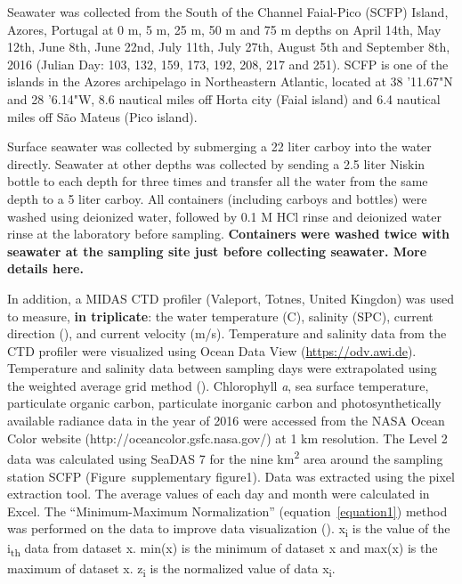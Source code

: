 \documentclass[a4,center,fleqn]{NAR}
\begin{document}
Seawater was collected from the South of the Channel Faial-Pico (SCFP) Island, Azores, Portugal at 0 m, 5 m, 25 m, 50 m and 75 m depths on April 14th, May 12th, June 8th, June 22nd, July 11th, July 27th, August 5th and September 8th, 2016 (Julian Day: 103, 132, 159, 173, 192, 208, 217 and 251). 
SCFP is one of the islands in the Azores archipelago in Northeastern Atlantic, located at 38 '11.67"N and 28 '6.14"W, 8.6 nautical miles off Horta city (Faial island) and 6.4 nautical miles off São Mateus (Pico island).

Surface seawater was collected by submerging a 22 liter carboy into the water directly.
Seawater at other depths was collected by sending a 2.5 liter Niskin bottle to each depth for three times and transfer all the water from the same depth to a 5 liter carboy.
All containers (including carboys and bottles) were washed using deionized water, followed by 0.1 M HCl rinse and deionized water rinse at the laboratory before sampling. 
\textbf{Containers were washed twice with seawater at the sampling site just before collecting seawater.
More details here.}

In addition, a MIDAS CTD profiler (Valeport, Totnes, United Kingdon) was used to measure, \textbf{in triplicate}: the water temperature (\degree C), salinity (SPC), current direction (\degree), and current velocity (m/s).
Temperature and salinity data from the CTD profiler were visualized using Ocean Data View (\url{https://odv.awi.de}). 
Temperature and salinity data between sampling days were extrapolated using the weighted average grid method (\cite{Schlitzer2002}).
Chlorophyll \textit{a}, sea surface temperature, particulate organic carbon, particulate inorganic carbon and photosynthetically available radiance data in the year of 2016 were accessed from the NASA Ocean Color website (http://oceancolor.gsfc.nasa.gov/) at 1 km resolution. 
The Level 2 data was calculated using SeaDAS 7 for the nine km\textsuperscript{2} area around the sampling station SCFP (Figure~supplementary figure1). 
Data was extracted using the pixel extraction tool. 
The average values of each day and month were calculated in Excel. 
The “Minimum-Maximum Normalization” (equation~\ref{equation1}) method was performed on the data to improve data visualization (\cite{Larose2014}). 
x\textsubscript{i} is the value of the i\textsubscript{th} data from dataset x. min(x) is the minimum of dataset x and max(x) is the maximum of dataset x. z\textsubscript{i} is the normalized value of data x\textsubscript{i}.
\end{document}
